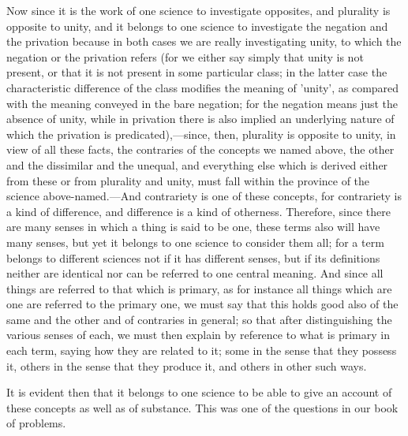 Now since it is the work of one science to investigate opposites, and plurality is opposite to unity, and it belongs to one science to investigate the negation and the privation because in both cases we are really investigating unity, to which the negation or the privation refers (for we either say simply that unity is not present, or that it is not present in some particular class; in the latter case the characteristic difference of the class modifies the meaning of 'unity', as compared with the meaning conveyed in the bare negation; for the negation means just the absence of unity, while in privation there is also implied an underlying nature of which the privation is predicated),—since, then, plurality is opposite to unity, in view of all these facts, the contraries of the concepts we named above, the other and the dissimilar and the unequal, and everything else which is derived either from these or from plurality and unity, must fall within the province of the science above-named.—And contrariety is one of these concepts, for contrariety is a kind of difference, and difference is a kind of otherness. Therefore, since there are many senses in which a thing is said to be one, these terms also will have many senses, but yet it belongs to one science to consider them all; for a term belongs to different sciences not if it has different senses, but if its definitions neither are identical nor can be referred to one central meaning. And since all things are referred to that which is primary, as for instance all things which are one are referred to the primary one, we must say that this holds good also of the same and the other and of contraries in general; so that after distinguishing the various senses of each, we must then explain by reference to what is primary in each term, saying how they are related to it; some in the sense that they possess it, others in the sense that they produce it, and others in other such ways.

It is evident then that it belongs to one science to be able to give an account of these concepts as well as of substance. This was one of the questions in our book of problems.

